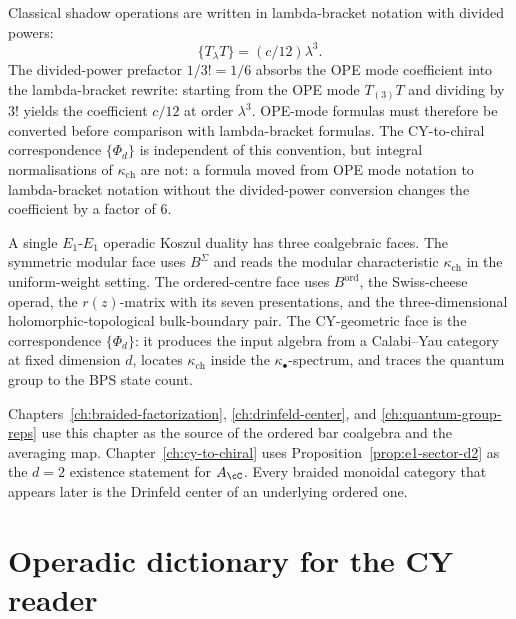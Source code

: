 \begin{remark}
\label{rem:lambda-bracket-vol3}
Classical shadow operations are written in lambda-bracket notation with divided powers:
\[
 \{T_\lambda T\} = (c/12)\lambda^3 .
\]
The divided-power prefactor $1/3! = 1/6$ absorbs the OPE mode coefficient into the lambda-bracket rewrite: starting from the OPE mode $T_{(3)}T$ and dividing by $3!$ yields the coefficient $c/12$ at order $\lambda^3$. OPE-mode formulas must therefore be converted before comparison with lambda-bracket formulas. The CY-to-chiral correspondence $\{\Phi_d\}$ is independent of this convention, but integral normalisations of $\kappa_{\mathrm{ch}}$ are not: a formula moved from OPE mode notation to lambda-bracket notation without the divided-power conversion changes the coefficient by a factor of $6$.
\end{remark}

\begin{remark}
\label{rem:three-volume-thesis}
A single $E_1$-$E_1$ operadic Koszul duality has three coalgebraic faces. The symmetric modular face uses $B^{\Sigma}$ and reads the modular characteristic $\kappa_{\mathrm{ch}}$ in the uniform-weight setting. The ordered-centre face uses $B^{\mathrm{ord}}$, the Swiss-cheese operad, the $r(z)$-matrix with its seven presentations, and the three-dimensional holomorphic-topological bulk-boundary pair. The CY-geometric face is the correspondence $\{\Phi_d\}$: it produces the input algebra from a Calabi--Yau category at fixed dimension $d$, locates $\kappa_{\mathrm{ch}}$ inside the $\kappa_\bullet$-spectrum, and traces the quantum group to the BPS state count.
\end{remark}

\begin{remark}
\label{rem:e1-ordered-bar-use}
Chapters~\ref{ch:braided-factorization}, \ref{ch:drinfeld-center}, and \ref{ch:quantum-group-reps} use this chapter as the source of the ordered bar coalgebra and the averaging map. Chapter~\ref{ch:cy-to-chiral} uses Proposition~\ref{prop:e1-sector-d2} as the $d=2$ existence statement for $A_\cC$. Every braided monoidal category that appears later is the Drinfeld center of an underlying ordered one.
\end{remark}

\section{Operadic dictionary for the CY reader}
\label{sec:operadic-dictionary}

